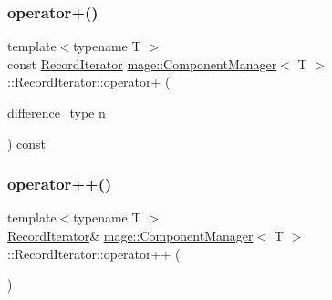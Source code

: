 \subsubsection{\texorpdfstring{operator+()}{operator+()}}
{\footnotesize\ttfamily template$<$typename T $>$ \\
const \mbox{\hyperlink{classmage_1_1_component_manager_1_1_record_iterator}{Record\+Iterator}} \mbox{\hyperlink{classmage_1_1_component_manager}{mage\+::\+Component\+Manager}}$<$ T $>$\+::Record\+Iterator\+::operator+ (\begin{DoxyParamCaption}\item[{\mbox{\hyperlink{classmage_1_1_component_manager_1_1_record_iterator_a3ca7b08fca57e3f69c5de58be46edd70}{difference\+\_\+type}}}]{n }\end{DoxyParamCaption}) const\hspace{0.3cm}{\ttfamily [noexcept]}}

\mbox{\label{classmage_1_1_component_manager_1_1_record_iterator_a1be474812ab8f6b04232904faa263cff}} 
\subsubsection{\texorpdfstring{operator++()}{operator++()}}
{\footnotesize\ttfamily template$<$typename T $>$ \\
\mbox{\hyperlink{classmage_1_1_component_manager_1_1_record_iterator}{Record\+Iterator}}\& \mbox{\hyperlink{classmage_1_1_component_manager}{mage\+::\+Component\+Manager}}$<$ T $>$\+::Record\+Iterator\+::operator++ (\begin{DoxyParamCaption}{ }\end{DoxyParamCaption})\hspace{0.3cm}{\ttfamily [noexcept]}}

\mbox{\label{classmage_1_1_component_manager_1_1_record_iterator_a48d9977a5e4d8fbfec07223cb7cdb6f1}} 

